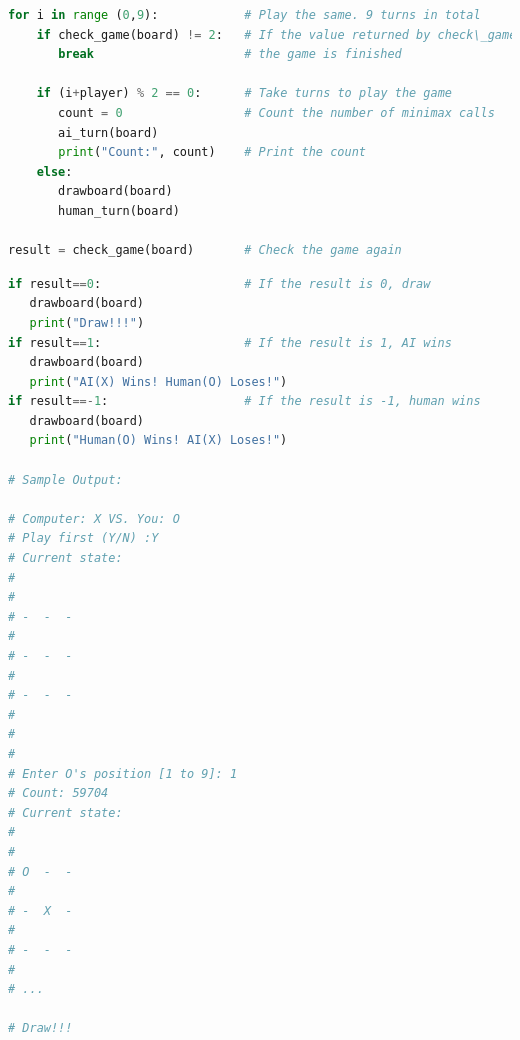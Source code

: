 \documentclass{book}
\begin{document}
\begin{lstlisting}[language=Python, basicstyle=\ttfamily\small, keywordstyle=\color{blue}, commentstyle=\color{forestgreen}, stringstyle=\color{red}, showstringspaces=false]
for i in range (0,9):            # Play the same. 9 turns in total
    if check_game(board) != 2:   # If the value returned by check\_game is not 2,
       break                     # the game is finished

    if (i+player) % 2 == 0:      # Take turns to play the game
       count = 0                 # Count the number of minimax calls
       ai_turn(board)
       print("Count:", count)    # Print the count
    else:
       drawboard(board)
       human_turn(board)

result = check_game(board)       # Check the game again
\end{lstlisting}
\newpage
\begin{lstlisting}[language=Python, basicstyle=\ttfamily\small, keywordstyle=\color{blue}, commentstyle=\color{forestgreen}, stringstyle=\color{red}, showstringspaces=false]
if result==0:                    # If the result is 0, draw
   drawboard(board)
   print("Draw!!!")
if result==1:                    # If the result is 1, AI wins
   drawboard(board)
   print("AI(X) Wins! Human(O) Loses!")
if result==-1:                   # If the result is -1, human wins
   drawboard(board)
   print("Human(O) Wins! AI(X) Loses!")

# Sample Output:

# Computer: X VS. You: O
# Play first (Y/N) :Y
# Current state: 
# 
# 
# -  -  -  
# 
# -  -  -  
# 
# -  -  -  
# 
# 
# 
# Enter O's position [1 to 9]: 1
# Count: 59704
# Current state: 
# 
# 
# O  -  -  
# 
# -  X  -  
# 
# -  -  -  
# 
# ...

# Draw!!!
\end{lstlisting}
\end{document}
